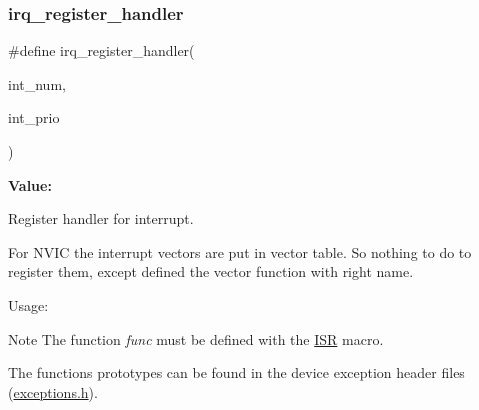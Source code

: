 \subsubsection{\texorpdfstring{irq\_register\_handler}{irq\_register\_handler}}
{\footnotesize\ttfamily \#define irq\+\_\+register\+\_\+handler(\begin{DoxyParamCaption}\item[{}]{int\+\_\+num,  }\item[{}]{int\+\_\+prio }\end{DoxyParamCaption})}

{\bfseries Value\+:}
\begin{DoxyCode}{0}

\end{DoxyCode}


Register handler for interrupt. 

For N\+V\+IC the interrupt vectors are put in vector table. So nothing to do to register them, except defined the vector function with right name.

Usage\+: 
\begin{DoxyCode}{0}
\end{DoxyCode}


\begin{DoxyNote}{Note}
The function {\itshape func} must be defined with the \mbox{\hyperlink{group__gumstix__dp8390_ga421ef10418d62e6b65390cb8cdab5c15}{I\+SR}} macro. 

The functions prototypes can be found in the device exception header files (\mbox{\hyperlink{exceptions_8h}{exceptions.\+h}}). 
\end{DoxyNote}
